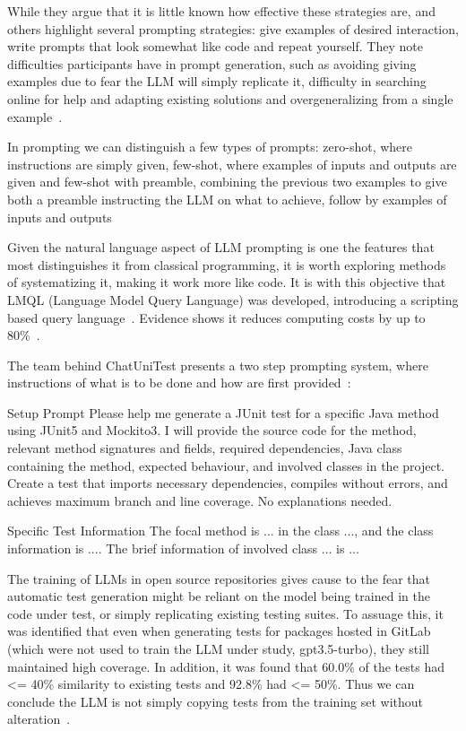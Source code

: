 While they argue that it is little known how effective these strategies are, \citet{kn:johnny} and others highlight several prompting strategies: give examples of desired interaction, write prompts that look somewhat like code and repeat yourself. They note difficulties participants have in prompt generation, such as avoiding giving examples due to fear the LLM will simply replicate it, difficulty in searching online for help and adapting existing solutions and overgeneralizing from a single example~\cite{kn:johnny}.

In prompting we can distinguish a few types of prompts: zero-shot, where instructions are simply given, few-shot, where examples of inputs and outputs are given and few-shot with preamble, combining the previous two examples to give both a preamble instructing the LLM on what to achieve, follow by examples of inputs and outputs~\cite{kn:promptprofiannaca}

Given the natural language aspect of LLM prompting is one the features that most distinguishes it from classical programming, it is worth exploring methods of systematizing it, making it work more like code. It is with this objective that LMQL (Language Model Query Language) was developed, introducing a scripting based query language~\cite{kn:lmql}. Evidence shows it reduces computing costs by up to 80\%~\cite{kn:lmql}.

The team behind ChatUniTest presents a two step prompting system, where instructions of what is to be done and how are first provided~\cite{kn:chatunitest}:

\begin{prompt}
Setup Prompt
Please help me generate a JUnit test for a specific Java method using JUnit5 and Mockito3.
I will provide the source code for the method, relevant method signatures and fields, required dependencies, Java class containing the method, expected behaviour, and involved classes in the project.
Create a test that imports necessary dependencies, compiles without errors, and achieves maximum branch and line coverage. 
No explanations needed. 

Specific Test Information
The focal method is ... in the class ..., and the class information is .... The brief information of involved class ... is ...   
\end{prompt}


The training of LLMs in open source repositories gives cause to the fear that automatic test generation might be reliant on the model being trained in the code under test, or simply replicating existing testing suites. To assuage this, it was identified that even when generating tests for packages hosted in GitLab (which were not used to train the LLM under study, gpt3.5-turbo), they still maintained high coverage. In addition, it was found that 60.0\% of the tests had <= 40\% similarity to existing tests and 92.8\% had <= 50\%. Thus we can conclude the LLM is not simply copying tests from the training set without alteration~\cite{kn:max}.


